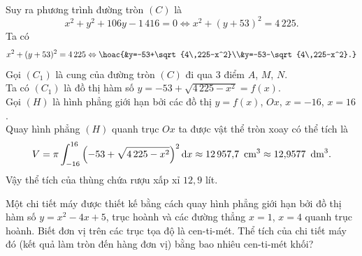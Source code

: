 \begin{bt}
{\begin{eqnarray*}
		\end{eqnarray*}
		Suy  ra phương trình đường tròn $(C)$ là
		 \[x^2+y^2+106y-1\,416=0\Leftrightarrow x^2+(y+53)^2=4\,225.
		\] 
		 Ta có
		\[x^2+(y+53)^2=4\,225\Leftrightarrow\hoac{&y=-53+\sqrt{4\,225-x^2}\\&y=-53-\sqrt{4\,225-x^2}.} 
		 \]
		Gọi $(C_1)$ là cung của đường tròn $(C)$ đi qua $3$  điểm $A$, $M$, $N$.\\
		Ta có $(C_1)$  là đồ thị hàm số $y=-53+\sqrt{4\,225-x^2}=f(x)$.\\
		Gọi $(H)$  là hình phẳng giới hạn bởi các đồ thị $y=f(x)$, $Ox$, $x=-16$, $x=16$.\\
		Quay hình phẳng $(H)$ quanh trục $Ox$ ta được vật  thể tròn xoay có thể tích là
		\begin{align*}
			V=\pi\displaystyle\int_{-16}^{16}\left(-53+\sqrt{4\,225-x^2}\right)^2\mathrm{d}x\approx12\,957{,}7\text{ \,cm}^3\approx12{,}9577\text{ \,dm}^3. 
		\end{align*}
		Vậy thể tích của thùng chứa rượu xấp xỉ $12{,}9$ lít. 
	} 
\end{bt}

\begin{bt}%
	Một chi  tiết máy được thiết kế bằng cách quay hình phẳng giới hạn bởi đồ thị hàm số $y=x^2-4x+5$, trục hoành và các đường thẳng $x=1$, $x=4$ quanh trục hoành. Biết đơn vị trên các trục tọa độ là cen-ti-mét. Thể tích của chi tiết máy đó (kết quả làm tròn đến hàng đơn vị) bằng bao nhiêu cen-ti-mét khối?
\end{bt}

